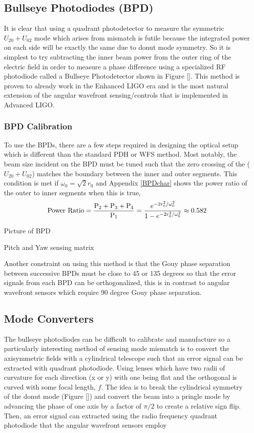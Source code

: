 	\subsection{Bullseye Photodiodes (BPD)}
	It is clear that using a quadrant photodetector to measure the symmetric $U_{20} + U_{02}$ mode which arises from mismatch is futile because the integrated power on each side will be exactly the same due to donut mode symmetry. So it is simplest to try subtracting the inner beam power from the outer ring of the electric field in order to measure a phase difference using a specialized RF photodiode called a Bullseye Photodetector shown in Figure [].  This method is proven to already work in the Enhanced LIGO era \cite{MuellerMM} and is the most natural extension of the angular wavefront sensing/controls that is implemented in Advanced LIGO.
	
	\subsubsection{BPD Calibration}
		To use the BPDs, there are a few steps required in designing the optical setup which is different than the standard PDH or WFS method.  Most notably, the beam size incident on the BPD must be tuned such that the zero crossing of the ($U_{20} + U_{02}$) matches the boundary between the inner and outer segments.  This condition is met if $\omega_{0} = \sqrt{2} r_0$ and Appendix \ref{BPDchar} shows the power ratio of the outer to inner segments when this is true,
		\begin{equation}
		\text{Power Ratio} = \frac{\text{P}_2 + \text{P}_3 + \text{P}_4}{\text{P}_1}  \\
		= \frac{e^{-2r_0^2/ \omega_{0}^2}} {1 - e^{-2r_0^2/ \omega_{0}^2 }} \approx 0.582
		\end{equation}
	
		
		Picture of BPD
		
		Pitch and Yaw sensing matrix

		Another constraint on using this method is that the Gouy phase separation between successive BPDs must be close to 45 or 135 degrees so that the error signals from each BPD can be orthogonalized, this is in contrast to angular wavefront sensors which require 90 degree Gouy phase separation.


\subsection{Mode Converters}
	The bullseye photodiodes can be difficult to calibrate and manufacture so a particularly interesting method of sensing mode mismatch is to convert the axisymmetric fields with a cylindrical telescope such that an error signal can be extracted with quadrant photodiode.  Using lenses which have two radii of curvature for each direction (x or y) with one being flat and the orthogonal is curved with some focal length, $f$.  The idea is to break the cylindrical symmetry of the donut mode (Figure []) and convert the beam into a pringle mode by advancing the phase of one axis by a factor of $\pi/2$ to create a relative sign flip.  Then, an error signal can extracted using the radio frequency quadrant photodiode that the angular wavefront sensors employ

